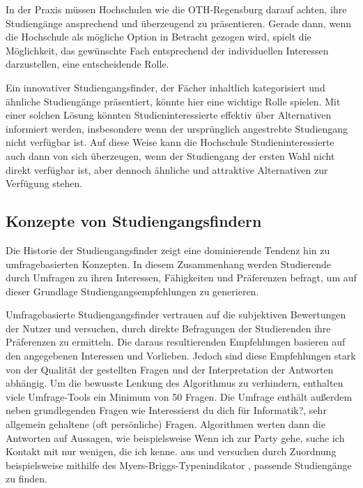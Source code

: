 In der Praxis müssen Hochschulen wie die OTH-Regensburg darauf achten, ihre Studiengänge ansprechend und überzeugend zu präsentieren. Gerade dann, wenn die Hochschule als mögliche Option in Betracht gezogen wird, spielt die Möglichkeit, das gewünschte Fach entsprechend der individuellen Interessen darzustellen, eine entscheidende Rolle.

Ein innovativer Studiengangsfinder, der Fächer inhaltlich kategorisiert und ähnliche Studiengänge präsentiert, könnte hier eine wichtige Rolle spielen. Mit einer solchen Lösung könnten Studieninteressierte effektiv über Alternativen informiert werden, insbesondere wenn der ursprünglich angestrebte Studiengang nicht verfügbar ist. Auf diese Weise kann die Hochschule Studieninteressierte auch dann von sich überzeugen, wenn der Studiengang der ersten Wahl nicht direkt verfügbar ist, aber dennoch ähnliche und attraktive Alternativen zur Verfügung stehen.


\subsection{Konzepte von Studiengangsfindern}\label{sec:konzepte-von-studiengangsfindern}
Die Historie der Studiengangsfinder zeigt eine dominierende Tendenz hin zu
umfragebasierten Konzepten. In diesem Zusammenhang werden Studierende durch
Umfragen zu ihren Interessen, Fähigkeiten und Präferenzen befragt, um auf dieser
Grundlage Studiengangsempfehlungen zu generieren.

Umfragebasierte Studiengangsfinder vertrauen auf die subjektiven Bewertungen der Nutzer und versuchen, durch direkte Befragungen der Studierenden ihre Präferenzen zu ermitteln. Die daraus resultierenden Empfehlungen basieren auf den angegebenen Interessen und Vorlieben. Jedoch sind diese Empfehlungen stark von der Qualität der gestellten Fragen und der Interpretation der Antworten abhängig. Um die bewusste Lenkung des Algorithmus zu verhindern, enthalten viele Umfrage-Tools ein Minimum von 50 Fragen. Die Umfrage enthält außerdem neben grundlegenden Fragen wie \glqq Interessierst du dich für Informatik?\grqq{}, sehr allgemein gehaltene (oft persönliche) Fragen. Algorithmen werten dann die Antworten auf Aussagen, wie beispielsweise \glqq Wenn ich zur Party gehe, suche ich Kontakt mit nur wenigen, die ich kenne.\grqq{} aus und versuchen durch Zuordnung beispielsweise mithilfe des Myers-Briggs-Typenindikator \parencite{company_mbti_2023}, passende Studiengänge zu finden. \parencite{uniturmde_studiumsfinder_2023}

